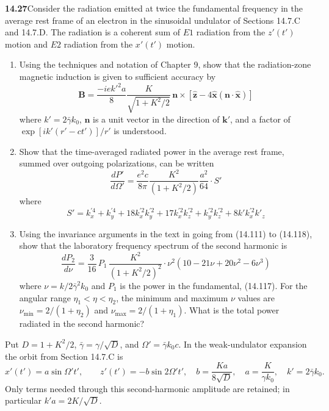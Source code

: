 \par\bigskip
\noindent\textbf{14.27}\quad Consider the radiation emitted at twice the fundamental frequency in the average rest frame of an electron in the sinusoidal undulator of Sections 14.7.C and 14.7.D. The radiation is a coherent sum of $E1$ radiation from the $z'(t')$ motion and $E2$ radiation from the $x'(t')$ motion.
\begin{enumerate}
\item[(a)] Using the techniques and notation of Chapter 9, show that the radiation-zone magnetic induction is given to sufficient accuracy by
\[
\mathbf{B}=\frac{-iek'^{2}a}{8}\frac{K}{\sqrt{1+K^{2}/2}}\,\mathbf{n}\times[\hat{\mathbf{z}}-4\hat{\mathbf{x}}(\mathbf{n}\cdot\hat{\mathbf{x}})]
\]
where $k'=2\bar{\gamma}k_{0}$, $\mathbf{n}$ is a unit vector in the direction of $\mathbf{k}'$, and a factor of $\exp[ik'(r'-ct')]/r'$ is understood.
\item[(b)] Show that the time-averaged radiated power in the average rest frame, summed over outgoing polarizations, can be written
\[
\frac{dP'}{d\Omega'}=\frac{e^{2}c}{8\pi}\frac{K^{2}}{(1+K^{2}/2)}\frac{a^{2}}{64}\cdot S'
\]
where
\[
S'=k_{x}^{\prime4}+k_{y}^{\prime4}+18k_{x}^{\prime2}k_{y}^{\prime2}+17k_{x}^{\prime2}k_{z}^{\prime2}+k_{y}^{\prime2}k_{z}^{\prime2}+8k'k_{x}^{\prime2}k'_{z}
\]
\item[(c)] Using the invariance arguments in the text in going from (14.111) to (14.118), show that the laboratory frequency spectrum of the second harmonic is
\[
\frac{dP_{2}}{d\nu}=\frac{3}{16}\,P_{1}\,\frac{K^{2}}{(1+K^{2}/2)^{2}}\cdot\nu^{2}(10-21\nu+20\nu^{2}-6\nu^{3})
\]
where $\nu=k/2\bar{\gamma}^{2}k_{0}$ and $P_{1}$ is the power in the fundamental, (14.117). For the angular range $\eta_{1}<\eta<\eta_{2}$, the minimum and maximum $\nu$ values are $\nu_{\min}=2/(1+\eta_{2})$ and $\nu_{\max}=2/(1+\eta_{1})$. What is the total power radiated in the second harmonic?
\end{enumerate}
\solution

Put $D=1+K^2/2$, $\bar\gamma=\gamma/\sqrt D$, and
$\Omega'=\bar\gamma k_0c$. In the weak-undulator expansion the orbit
from Section 14.7.C is
\[
x'(t')=a\sin\Omega't',\qquad
z'(t')=-b\sin2\Omega't',\quad
b=\frac{Ka}{8\sqrt D},\quad
 a=\frac K{\gamma k_0},\quad k'=2\bar\gamma k_0.
\]
Only terms needed through this second-harmonic amplitude are retained;
in particular $k'a=2K/\sqrt D$.

